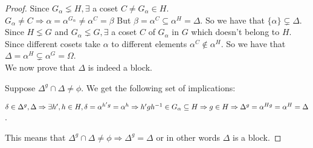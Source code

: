 \begin{proof}
Since $G_\alpha \lneq H,\exists$ a coset $C \neq G_\alpha \in H$. \\$G_\alpha \neq C \Rightarrow \alpha = \alpha^{G_\alpha} \not = \alpha^C = \beta$ But $\beta = \alpha^C \subseteq \alpha^H = \Delta$. So we have that $\{\alpha\} \subsetneq \Delta$. \\

Since $H \lneq G$ and $G_\alpha \lneq G, \exists$ a coset $C$ of $G_\alpha$ in $G$ which doesn't belong to $H$. Since different cosets take $\alpha$ to different elements $\alpha^C \notin \alpha^H$. So we have that $\Delta = \alpha^H \subsetneq \alpha^G = \Omega$. \\

We now prove that $\Delta$ is indeed a block. 

Suppose $\Delta^g \cap \Delta \neq \phi$. We get the following set of implications:

$\delta \in \Delta^g,\Delta \\
\Rightarrow \exists h',h \in H, \delta = \alpha^{h'g} = \alpha^h \\
\Rightarrow h'gh^{-1} \in G_\alpha \subseteq H \\
\Rightarrow g \in H \\
\Rightarrow \Delta^g = \alpha^{Hg} = \alpha^H = \Delta$. 

This means that $\Delta^g \cap \Delta \neq \phi \Rightarrow \Delta^g = \Delta$ or in other words $\Delta$ is a block.

\end{proof}





